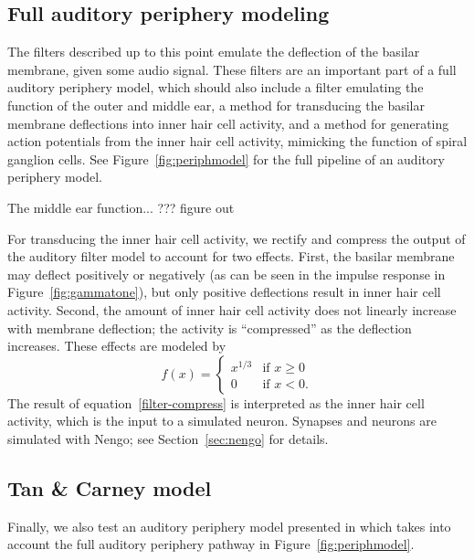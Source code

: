 \subsection{Full auditory periphery modeling}

The filters described up to this point
emulate the deflection
of the basilar membrane,
given some audio signal.
These filters are an important part
of a full auditory periphery model,
which should also include
a filter emulating the function
of the outer and middle ear,
a method for transducing
the basilar membrane deflections
into inner hair cell activity,
and a method for generating
action potentials from the inner hair cell activity,
mimicking the function of spiral ganglion cells.
See Figure~\ref{fig:periphmodel} for the full pipeline
of an auditory periphery model.


The middle ear function...
??? figure out

For transducing the inner hair cell activity,
we rectify and compress the output
of the auditory filter model
to account for two effects.
First, the basilar membrane may deflect
positively or negatively
(as can be seen in the impulse response
in Figure~\ref{fig:gammatone}),
but only positive deflections result in
inner hair cell activity.
Second, the amount of inner hair cell activity
does not linearly increase with
membrane deflection;
the activity is ``compressed''
as the deflection increases.
These effects are modeled by
\begin{equation} \label{filter-compress}
  f(x) =
  \begin{cases}
    x^{1 / 3} &\text{if } x \ge 0 \\
    0 &\text{if } x < 0.
  \end{cases}
\end{equation}
The result of equation~\eqref{filter-compress}
is interpreted as the inner hair cell activity,
which is the input to a simulated neuron.
Synapses and neurons are simulated with Nengo;
see Section~\ref{sec:nengo} for details.

\subsection{Tan \& Carney model}

Finally, we also test
an auditory periphery model
presented in \cite{tan2003}
which takes into account
the full auditory periphery pathway
in Figure~\ref{fig:periphmodel}.

